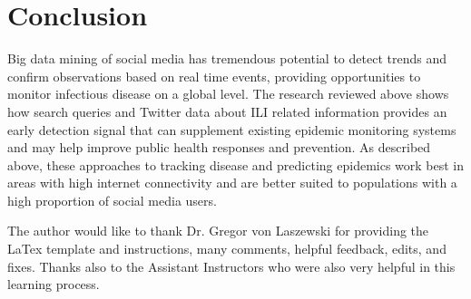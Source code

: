 \documentclass[sigconf]{acmart}
\begin{document}
\section{Conclusion}

Big data mining of social media has tremendous potential to detect trends and confirm 
observations based on real time events, providing opportunities to monitor infectious 
disease on a global level. The research reviewed above shows how search queries and 
Twitter data about ILI related information provides an early detection signal that can
supplement existing epidemic monitoring systems and may help improve public health 
responses and prevention. As described above, these approaches to tracking disease and
predicting epidemics work best in areas with high internet connectivity and are better 
suited to populations with a high proportion of social media users.

\begin{acks}

  The author would like to thank Dr. Gregor von Laszewski for providing the LaTex template
  and instructions, many comments, helpful feedback, edits, and fixes. Thanks also 
  to the Assistant Instructors who were also very helpful in this learning process. 

\end{acks}


 


\end{document}
